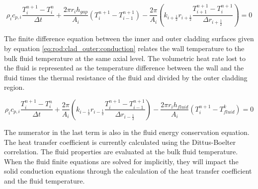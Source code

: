 \begin{equation}
	\label{eq:rod:clad_inner:conduction}
	  \rho_{i}c_{p,i}\frac{T^{n+1}_{i}-T^{n}_{i}}{\Delta t}
	+ \frac{2\pi r_{i}h_{gap}}{A_{i}}\left(T^{n+1}_{i}-T^{n+1}_{i-1}\right)
	- \frac{2\pi}{A_{i}}
 	    \left(k_{i+\frac{1}{2}}r_{i+\frac{1}{2}}
		\frac{T^{n+1}_{i+1}-T^{n+1}_{i}}{\Delta r_{i+\frac{1}{2}}}\right)
	= 0
\end{equation}

The finite difference equation between the inner and outer cladding surfaces
given by equation \ref{eq:rod:clad_outer:conduction} relates the wall
temperature to the bulk fluid temperature at the same axial level. The
volumetric heat rate lost to the fluid is represented as the temperature
difference between the wall and the fluid times the thermal resistance of the
fluid and divided by the outer cladding region.

\begin{equation}
	\label{eq:rod:clad_outer:conduction}
	  \rho_{i}c_{p,i}\frac{T^{n+1}_{i}-T^{n}_{i}}{\Delta t}
	+ \frac{2\pi}{A_{i}}
 	    \left(k_{i-\frac{1}{2}}r_{i-\frac{1}{2}}
		\frac{T^{n+1}_{i}-T^{n+1}_{i-1}}{\Delta r_{i-\frac{1}{2}}}\right)
    - \frac{2\pi r_{i}h_{fluid}}{A_{i}}\left(T^{n+1}_{i}-T^{k}_{fluid}\right)
	= 0
\end{equation}

The numerator in the last term is also in the fluid energy conservation
equation. The heat transfer coefficient is currently calculated using the
Dittus-Boelter correlation. The fluid properties are evaluated at the bulk fluid
temperature. When the fluid finite equations are solved for implicitly, they
will impact the solid conduction equations through the calculation of the heat
transfer coefficient and the fluid temperature.